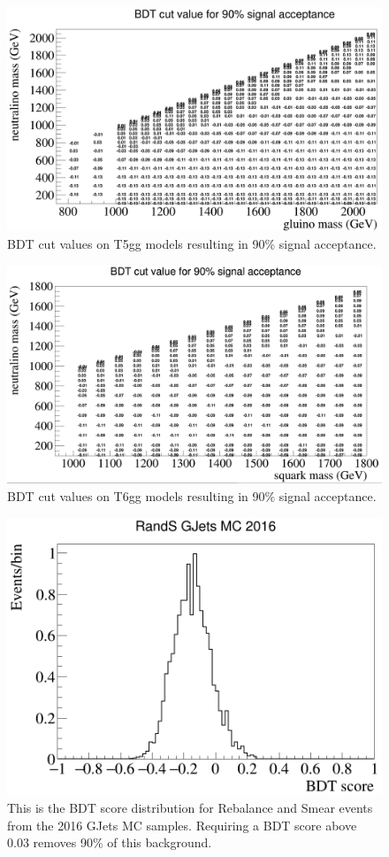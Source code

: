 \begin{figure}[h]
	\centering
	\includegraphics[width=1.5\linewidth,angle=90]{Figures/T5Wg_bdtcuts}
	\caption[BDT cut values on T5gg models resulting in 90\% signal acceptance.]{BDT cut values on T5gg models resulting in 90\% signal acceptance.}
	\label{fig:t5wgbdtcuts}
\end{figure}
\begin{figure}[h]
	\centering
	\includegraphics[width=1.5\linewidth, angle=90]{Figures/T6Wg_bdtcuts}
	\caption[BDT cut values on T6gg models resulting in 90\% signal acceptance.]{BDT cut values on T6gg models resulting in 90\% signal acceptance.}
	\label{fig:t6wgbdtcuts}
\end{figure}
\begin{figure}[h]
	\centering
	\includegraphics[width=0.7\linewidth]{Figures/GJets_BDT_2016}
	\caption[BDT response to Rebalance and Smear events in 2016 GJets MC]{This is the BDT score distribution for Rebalance and Smear events from the 2016 GJets MC samples. Requiring a BDT score above 0.03 removes 90\% of this background.}
	\label{fig:bdtgjets}
\end{figure}
